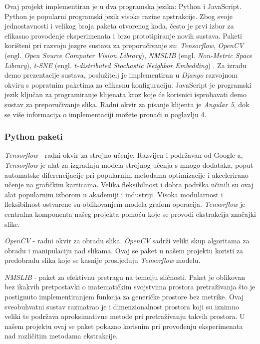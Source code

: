 \documentclass[times, utf8, proizvoljni, numeric]{fer}
\begin{document}
Ovaj projekt implementiran je u dva programska jezika: Python i JavaScript. 
Python je popularni programski jezik visoke razine apstrakcije. Zbog svoje jednostavnosti i velikog broja paketa otvorenog koda, često je prvi izbor za efikasno provođenje eksperimenata i brzo prototipiranje novih sustava. Paketi korišteni pri razvoju jezgre sustava za preporučivanje su: \textit{Tensorflow}, \textit{OpenCV} (engl. \textit{Open Source Computer Vision Library}), \textit{NMSLIB}  (engl. \textit{Non-Metric Space Library}), \textit{t-SNE}  (engl. \textit{t-distributed Stochastic Neighbor Embedding}) . Za izradu demo prezentacije sustava, poslužitelj je implementiran u \textit{Django} razvojnom okviru s popratnim paketima za efikasnu konfiguraciju. 
JavaScript je programski jezik ključan za programiranje klijenata kroz koje će korisnici isprobavati demo sustav za preporučivanje slika. Radni okvir za pisanje klijenta je \textit{Angular 5}, dok se više informacija o implementaciji možete pronaći u poglavlju 4.

\subsubsection{Python paketi }

\textit{Tensorflow} \cite{tensorflow2015-whitepaper} - radni okvir za strojno učenje. Razvijen i podržavan od Google-a, \textit{Tensorflow} je alat za izgradnju modela strojnog učenja s mnogo dodataka, poput automatske diferencijacije pri popularnim metodama optimizacije i akcelerirano učenje na grafičkim karticama. Velika fleksibilnost i dobra podrška učinili su ovaj alat popularnim izborom u akademiji i industriji. Visoka modularnost i fleksibilnost ostvarene su oblikovanjem modela grafom operacija.
\textit{Tensorflow} je centralna komponenta našeg projekta pomoću koje se provodi ekstrakcija značajki slike.

\textit{OpenCV} \cite{itseez2015opencv} - radni okvir za obradu slika. \textit{OpenCV} sadrži veliki skup algoritama za obradu i manipulaciju nad slikama. Ovaj se paket u našem projektu koristi za predobradu slika koje se kasnije prosljeđuju \textit{Tensorflow} modelu.


\textit{NMSLIB} \cite{NMSLIB} - paket za efektivnu pretragu na temelju sličnosti. Paket je oblikovan bez ikakvih pretpostavki o matematičkim svojstvima prostora pretraživanja što je postignuto implementiranjem funkcija za generičke prostore bez metrike. Ovaj sveobuhvatni sustav razmatrao je i dimenzionalnost prostora koji su iznimno veliki te podržava aproksimativne metode pri pretraživanju takvih prostora. U našem projektu ovaj se paket pokazao korisnim pri provođenju eksperimenata nad različitim metodama ekstrakcije. 
\end{document}
